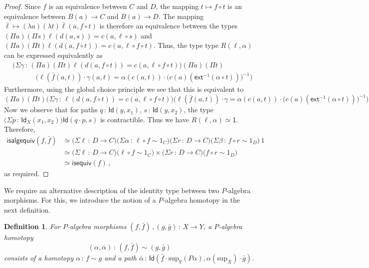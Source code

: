\documentclass[10pt,a4paper,oneside,reqno]{amsart}
\theoremstyle{mythm}
\theoremstyle{mydef}
\newtheorem{definition}[theorem]{Definition}
\theoremstyle{myrmk}
\newcommand{\co}{\,{:}\,}
\newcommand{\com}{\circ}
\newcommand{\ct}{\cdot}
\newcommand{\isequiv}{\mathsf{isequiv}}
\newcommand{\ext}{\mathsf{ext}}
\newcommand{\one}{\mathsf{1}}
\newcommand{\Id}{\mathsf{Id}}
\renewcommand{\sup}{\mathrm{sup}}
\newcommand{\isalgequiv}{\mathsf{isalgequiv}}
\begin{document}
\begin{proof}
Since $f$ is an equivalence between $C$ and $D$, the mapping $t \mapsto f \com t$ is an equivalence between $B(a) \to C$ and $B(a) \to D$. The mapping $\bar{\ell} \mapsto (\lambda a) (\lambda t) \bar{\ell}(a,f \com t)$ is therefore an equivalence between the types $(\Pi a) (\Pi s) \ell(d(a,s)) = c(a,\ell \com s)$ and $(\Pi a) (\Pi t) \ell(d(a,f \com t)) = c(a,\ell \com f \com t)$. Thus, the type type $R(\ell,\alpha)$ can be expressed equivalently as
\begin{align*}
& \big(\Sigma \gamma \co (\Pi a) (\Pi t) \ell(d(a,f \circ t))=c(a,\ell \circ f \circ t)\big) (\Pi a) (\Pi t) \\ & \;\;\;\;\;\;\;\;\;\;\;\; \Big(\ell(\bar{f}(a,t)) \ct \gamma(a,t) = \alpha(c(a,t)) \ct \big(c(a)(\ext^{-1}(\alpha \circ t))\big)^{-1}\Big)
\end{align*}
Furthermore, using the global choice principle we see that this is equivalent to
\[ (\Pi a) (\Pi t) \big(\Sigma \gamma \co \ell(d(a,f \circ t))=c(a,\ell \circ f \circ t)\big) \Big(\ell(\bar{f}(a,t)) \ct \gamma = \alpha(c(a,t)) \ct \big(c(a)(\ext^{-1}(\alpha \circ t))\big)^{-1}\Big) \]
Now we observe that for paths $q \co \Id(y,x_1)$, $s \co \Id(y,x_2)$, the type $\big(\Sigma p \co \Id_X(x_1,x_2)\big) \Id(q \ct p,s)$ is contractible. Thus we have $R(\ell,\alpha) \simeq \one$. Therefore,
\begin{align*} 
\isalgequiv(f,\bar{f}) 
  & \simeq   \big(\Sigma \ell \co D \to C \big) \big(\Sigma \alpha \co \ell \com f \sim 1_C \big) \big(\Sigma r  \co D \to C \big) 
 \big(\Sigma \beta \co f \com r \sim 1_D \big) \, 1 \\
 & \simeq \big(\Sigma \ell \co D \to C \big)  \big( \ell \com f \sim 1_C \big) \times 
 \big(\Sigma r  \co D \to C \big) \big( f \com r \sim 1_D \big) \\
 & \simeq \isequiv(f) \, ,
\end{align*} 
as required.
\end{proof}


We require an alternative description of the identity type between two $P$-algebra morphisms. For this, we introduce 
the notion of a $P$-algebra homotopy in the next definition.


\begin{definition}
For $P$-algebra morphisms $(f, \bar{f}) \, , (g, \bar{g}) \co X \to Y$, a \emph{$P$-algebra homotopy}  
\[
(\alpha, \bar{\alpha}) \co (f, \bar{f}) \sim (g, \bar{g})
\] 
consists of a homotopy $\alpha \co f \sim g$ and a path
$\bar{\alpha} \co \Id( \bar{f} \cdot \sup_Y (P \alpha) ,  \alpha(\sup_X)\cdot \bar{g})$. 
\end{definition}
\end{document}
